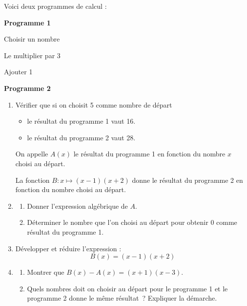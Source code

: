 \documentclass[exercice]{thedocument}%
\begin{document}
%
Voici deux programmes de calcul :\vskip5pt
\begin{minipage}[t]{.45\linewidth}
    {\bfseries Programme 1}
    \begin{mdframed}
        Choisir un nombre\par\smallskip
        Le multiplier par 3\par\smallskip
        Ajouter 1
    \end{mdframed}
\end{minipage}\hfil
\begin{minipage}[t]{.45\linewidth}
    {\bfseries Programme 2}
    \begin{mdframed}\centering{}\end{mdframed}
\end{minipage}
\begin{enumerate}
    \item Vérifier que si on choisit 5 comme nombre de départ
    \begin{itemize}
        \item le résultat du programme 1 vaut 16.
        \item le résultat du programme 2 vaut 28.
    \end{itemize}
    On appelle $A(x)$ le résultat du programme 1 en fonction du nombre $x$
    choisi au départ.\par\noindent
    La fonction $B:x\mapsto(x-1)(x+2)$ donne le résultat du programme 2 en
    fonction du nombre choisi au départ.
    \item
    \begin{enumerate}
        \item Donner l'expression algébrique de $A$.
        \item Déterminer le nombre que l'on choisi au départ pour obtenir
        $0$ comme résultat du programme 1.
    \end{enumerate}
    \item Développer et réduire l'expression :$$B(x)=(x-1)(x+2)$$
    \item
    \begin{enumerate}
        \item Montrer que $B(x)-A(x)=(x+1)(x-3)$.
        \item Quels nombres doit on choisir au départ pour le programme 1 et
        le programme 2 donne le même résultat~? Expliquer la démarche.
    \end{enumerate} 
\end{enumerate}
\end{document}

